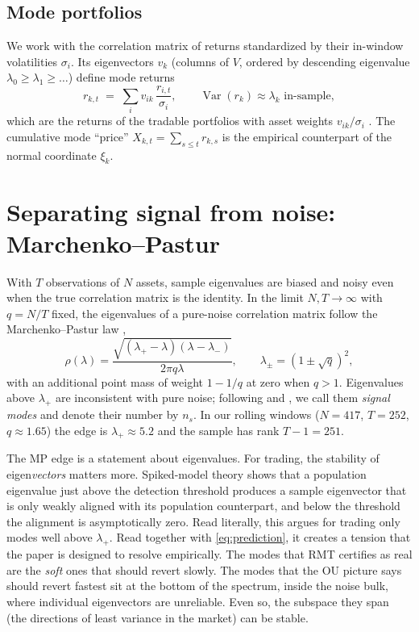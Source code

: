 \subsection{Mode portfolios}

We work with the correlation matrix of returns standardized by their
in-window volatilities $\sigma_i$. Its eigenvectors $v_k$ (columns of
$V$, ordered by descending eigenvalue $\lambda_0\ge\lambda_1\ge\dots$)
define mode returns
\begin{equation}
  r_{k,t} \;=\; \sum_i v_{ik}\,\frac{r_{i,t}}{\sigma_i},
  \qquad \operatorname{Var}(r_k)\approx\lambda_k \text{ in-sample},
  \label{eq:mode-return}
\end{equation}
which are the returns of the tradable portfolios with asset weights
$v_{ik}/\sigma_i$ \citep{avellaneda2010}. The cumulative mode ``price''
$X_{k,t}=\sum_{s\le t} r_{k,s}$ is the empirical counterpart of the
normal coordinate $\xi_k$.

\section{Separating signal from noise: Marchenko--Pastur}
\label{sec:rmt}

With $T$ observations of $N$ assets, sample eigenvalues are biased and
noisy even when the true correlation matrix is the identity. In the
limit $N,T\to\infty$ with $q=N/T$ fixed, the eigenvalues of a pure-noise
correlation matrix follow the Marchenko--Pastur law
\citep{marchenko1967},
\begin{equation}
  \rho(\lambda) = \frac{\sqrt{(\lambda_+-\lambda)(\lambda-\lambda_-)}}{2\pi q\lambda},
  \qquad
  \lambda_\pm = (1\pm\sqrt q)^2,
  \label{eq:mp}
\end{equation}
with an additional point mass of weight $1-1/q$ at zero when $q>1$.
Eigenvalues above $\lambda_+$ are inconsistent with pure noise; following
\citet{laloux1999} and \citet{plerou2002}, we call them \emph{signal
modes} and denote their number by $n_s$. In our rolling windows
($N=417$, $T=252$, $q\approx1.65$) the edge is $\lambda_+\approx 5.2$ and
the sample has rank $T-1=251$.

The MP edge is a statement about eigenvalues. For trading, the stability
of eigen\emph{vectors} matters more. Spiked-model theory
\citep{benaych2011} shows that a population eigenvalue just above the
detection threshold produces a sample eigenvector that is only weakly
aligned with its population counterpart, and below the threshold the
alignment is asymptotically zero. Read literally, this argues for
trading only modes well above $\lambda_+$. Read together with
\eqref{eq:prediction}, it creates a tension that the paper is designed
to resolve empirically. The modes that RMT certifies as real are the
\emph{soft} ones that should revert slowly. The modes that the OU
picture says should revert fastest sit at the bottom of the spectrum,
inside the noise bulk, where individual eigenvectors are unreliable. Even
so, the subspace they span (the directions of least variance in the
market) can be stable.
